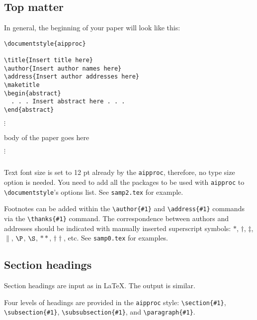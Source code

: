 \subsection{Top matter}

In general, the beginning of your paper will look like this:
\se\begin{verbatim}
\documentstyle{aipproc}

\title{Insert title here}
\author{Insert author names here}
\address{Insert author addresses here}
\maketitle
\begin{abstract}
  . . . Insert abstract here . . .
\end{abstract}
\end{verbatim}
\begin{center}
$\vdots$ \par
body of the paper goes here \par
$\vdots$ \par
\end{center}
\begin{verbatim}

\end{verbatim}\ee\noindent
Text font size is set to 12 pt already by the \verb+aipproc+, therefore, no
type size option is needed.  You need to add all the packages to be used with
\verb+aipproc+ to \verb+\documentstyle+'s options list. See \verb+samp2.tex+
for example.


Footnotes can be added within the \verb+\author{#1}+ and \verb+\address{#1}+
commands via the \verb+\thanks{#1}+ command. The correspondence
between authors and addresses should be indicated with manually inserted
superscript symbols: $*$, $\dagger$, $\ddagger$, $\|$, $\P$, $\S$,
 $**$, $\dagger\dagger$, etc. See \verb+samp0.tex+ for examples.

\subsection{Section headings}

Section headings are input as in \LaTeX. The output is similar.

Four levels of headings are provided in the \verb+aipproc+ style:
\verb+\section{#1}+, \verb+\subsection{#1}+, \verb+\subsubsection{#1}+, and
\verb+\paragraph{#1}+.

